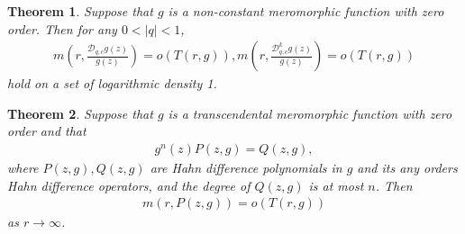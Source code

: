 \documentclass[10pt,a4paper]{amsart}
\theoremstyle{plain}
\newtheorem{theorem}{Theorem}
\theoremstyle{definition}
\theoremstyle{remark}
\begin{document}
\begin{theorem}\label{thm3.1}
	Suppose that $g$ is a non-constant meromorphic function with zero order. Then for any $0<|q|<1$,
	\begin{align*}
		m\left(r,\frac{\mathcal{D}_{q,c}g(z)}{g(z)}\right)=o(T(r,g)),
		m\left(r,\frac{\mathcal{D}_{q,c}^{k}g(z)}{g(z)}\right)=o(T(r,g))
	\end{align*}
	hold on a set of logarithmic density 1.
\end{theorem}

\begin{theorem}\label{thm2.5}
	Suppose that \(g\) is a transcendental meromorphic function with zero order and that
	\begin{align*}
		g^{n}(z)P(z,g)=Q(z,g),
	\end{align*}
	where \(P(z,g), Q(z,g)\) are Hahn difference polynomials in \(g\) and its any orders Hahn difference operators, and the degree of \(Q(z,g)\) is at most \(n\). Then
	\begin{align*}
		m(r,P(z,g))=o(T(r,g))
	\end{align*}
	as \(r\to\infty\).
\end{theorem}
\end{document}
